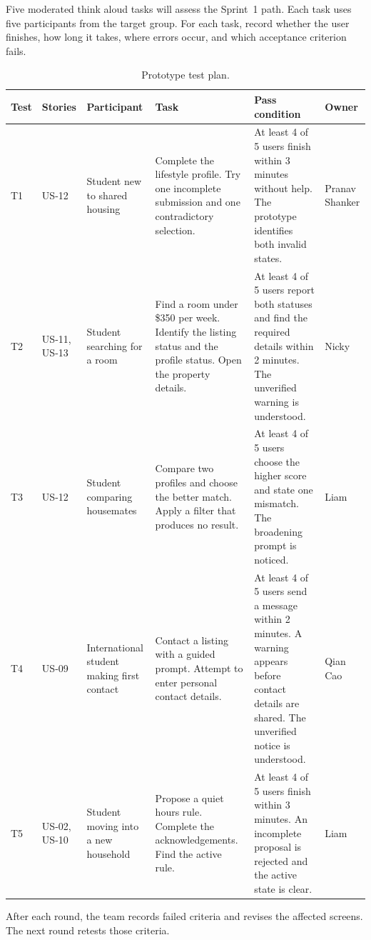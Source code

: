 \documentclass[11pt,a4paper]{article}
\begin{document}
Five moderated think aloud tasks will assess the Sprint~1 path. Each task uses five participants from the target group. For each task, record whether the user finishes, how long it takes, where errors occur, and which acceptance criterion fails.

\begin{table}[H]
    \centering
    \scriptsize
    \caption{Prototype test plan.}
    \begin{tabularx}{\textwidth}{@{}L{0.8cm}L{1.8cm}L{2.2cm}Y Y L{1.4cm}@{}}
        \toprule
        Test & Stories & Participant & Task & Pass condition & Owner\\
        \midrule
        T1 & US-12 & Student new to shared housing & Complete the lifestyle profile. Try one incomplete submission and one contradictory selection. & At least 4 of 5 users finish within 3 minutes without help. The prototype identifies both invalid states. & Pranav Shanker\\
        T2 & US-11, US-13 & Student searching for a room & Find a room under \$350 per week. Identify the listing status and the profile status. Open the property details. & At least 4 of 5 users report both statuses and find the required details within 2 minutes. The unverified warning is understood. & Nicky\\
        T3 & US-12 & Student comparing housemates & Compare two profiles and choose the better match. Apply a filter that produces no result. & At least 4 of 5 users choose the higher score and state one mismatch. The broadening prompt is noticed. & Liam\\
        T4 & US-09 & International student making first contact & Contact a listing with a guided prompt. Attempt to enter personal contact details. & At least 4 of 5 users send a message within 2 minutes. A warning appears before contact details are shared. The unverified notice is understood. & Qian Cao\\
        T5 & US-02, US-10 & Student moving into a new household & Propose a quiet hours rule. Complete the acknowledgements. Find the active rule. & At least 4 of 5 users finish within 3 minutes. An incomplete proposal is rejected and the active state is clear. & Liam\\
        \bottomrule
    \end{tabularx}
    \label{tabtestoverview}
\end{table}

After each round, the team records failed criteria and revises the affected screens. The next round retests those criteria.
\end{document}
